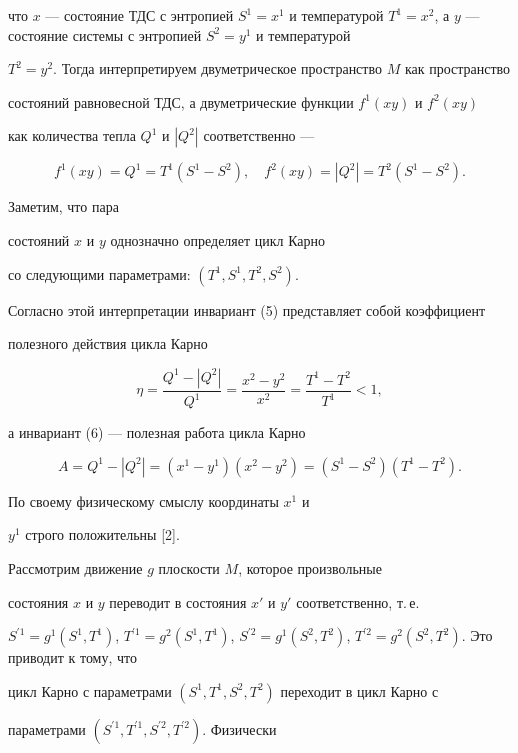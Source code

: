 что $x$ --- состояние ТДС с энтропией $S^1=x^1$ и температурой $T^1 =


x^2$, а $y$ --- состояние системы с энтропией $S^2=y^1$ и температурой


$T^2=y^2$. Тогда интерпретируем двуметрическое пространство $M$ как пространство


состояний равновесной ТДС, а двуметрические функции $f^1(xy)$ и $f^2(xy)$


как количества тепла $Q^1$ и $|Q^2|$ соответственно ---


$$


f^1(xy)=Q^1=T^1(S^1 - S^2),\quad


f^2(xy)=|Q^2|=T^2(S^1 - S^2).


$$


Заметим, что пара


состояний $x$ и $y$ однозначно определяет цикл Карно


со следующими параметрами: $(T^1,S^1,T^2,S^2)$.


Согласно этой интерпретации инвариант (5) представляет собой коэффициент


полезного действия цикла Карно


$$


\eta=\frac{Q^1 - |Q^2|}{Q^1}=\frac{x^2 - y^2}{x^2}=\frac{T^1 - T^2}{T^1} < 1,


$$


а инвариант (6) --- полезная работа цикла Карно


$$


A=Q^1 - |Q^2|=(x^1 - y^1)(x^2 - y^2)=(S^1 - S^2)(T^1 - T^2).


$$


По своему физическому смыслу координаты $x^1$ и


$y^1$ строго положительны [2].





Рассмотрим движение $g$ плоскости $M$, которое произвольные


состояния $x$ и $y$ переводит в состояния $x'$ и $y'$ соответственно, т.\,е.


$S^{\prime 1}=g^1(S^1,T^1)$, $T^{\prime 1}=g^2(S^1,T^1)$, $S^{\prime 2} =


g^1(S^2,T^2)$, $T^{\prime 2}=g^2(S^2,T^2)$. Это приводит к тому, что


цикл Карно с параметрами $(S^1,T^1,S^2,T^2)$ переходит в цикл Карно с


параметрами $(S^{\prime 1},T^{\prime 1},S^{\prime 2},T^{\prime 2})$. Физически


